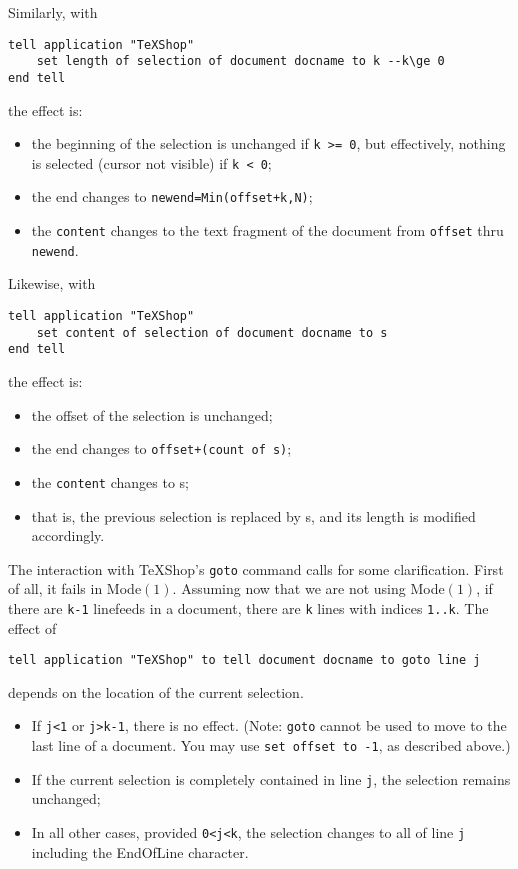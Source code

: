 \documentclass[11pt]{amsart}
\def\TeXShop{\TeX Shop\xspace}
\begin{document}
Similarly, with
\begin{verbatim}
tell application "TeXShop"
    set length of selection of document docname to k --k\ge 0
end tell
\end{verbatim}
the effect is:
\begin{itemize}
\item
the beginning of the selection is unchanged if \verb|k >= 0|, but effectively, nothing is selected (cursor not visible) if \verb|k < 0|;
\item the end  changes to {\tt newend=Min(offset+k,N)};
\item  the {\tt content} changes to the text fragment of the document from {\tt offset} thru {\tt newend}.
\end{itemize}
Likewise, with
\begin{verbatim}
tell application "TeXShop"
    set content of selection of document docname to s
end tell
\end{verbatim}
the effect is:
\begin{itemize}
\item
the offset of the selection is unchanged;
\item the end  changes to {\tt offset+(count of s)};
\item  the {\tt content} changes to s;
\item that is, the previous selection is replaced by s, and its length is modified accordingly.
\end{itemize}
The interaction with \TeXShop's {\tt goto} command calls for some clarification.
First of all, it fails in Mode$(1)$. Assuming now that we are not using Mode$(1)$, if there are {\tt k-1} linefeeds in a document, there are {\tt k} lines with indices {\tt 1..k}. The effect of 
\begin{verbatim}
tell application "TeXShop" to tell document docname to goto line j
\end{verbatim}
depends on the location of the current selection.
\begin{itemize}
\item If {\tt j<1} or {\tt j>k-1}, there is no effect. (Note: {\tt goto} cannot be used to move to the last line of a document. You may use {\tt set offset to -1}, as described above.)
\item
If the current selection is completely contained in line {\tt j}, the selection remains unchanged;
\item In all other cases, provided {\tt 0<j<k}, the selection changes to all of line {\tt j} including the EndOfLine character.
\end{itemize}
\end{document}
